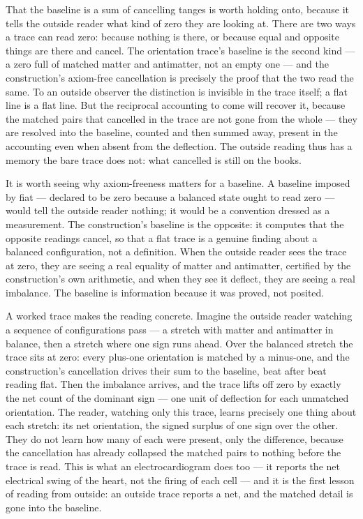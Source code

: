 That the baseline is a sum of cancelling tanges is worth holding onto, because it tells the outside reader
what kind of zero they are looking at. There are two ways a trace can read zero: because nothing is there,
or because equal and opposite things are there and cancel. The orientation trace's baseline is the second
kind --- a zero full of matched matter and antimatter, not an empty one --- and the construction's
axiom-free cancellation is precisely the proof that the two read the same. To an outside observer the
distinction is invisible in the trace itself; a flat line is a flat line. But the reciprocal accounting to
come will recover it, because the matched pairs that cancelled in the trace are not gone from the whole
--- they are resolved into the baseline, counted and then summed away, present in the accounting even when
absent from the deflection. The outside reading thus has a memory the bare trace does not: what cancelled
is still on the books.

It is worth seeing why axiom-freeness matters for a baseline. A baseline imposed by fiat --- declared to
be zero because a balanced state ought to read zero --- would tell the outside reader nothing; it would
be a convention dressed as a measurement. The construction's baseline is the opposite: it computes that
the opposite readings cancel, so that a flat trace is a genuine finding about a balanced configuration,
not a definition. When the outside reader sees the trace at zero, they are seeing a real equality of
matter and antimatter, certified by the construction's own arithmetic, and when they see it deflect, they
are seeing a real imbalance. The baseline is information because it was proved, not posited.

A worked trace makes the reading concrete. Imagine the outside reader watching a sequence of
configurations pass --- a stretch with matter and antimatter in balance, then a stretch where one sign
runs ahead. Over the balanced stretch the trace sits at zero: every plus-one orientation is matched by a
minus-one, and the construction's cancellation drives their sum to the baseline, beat after beat reading
flat. Then the imbalance arrives, and the trace lifts off zero by exactly the net count of the dominant
sign --- one unit of deflection for each unmatched orientation. The reader, watching only this trace,
learns precisely one thing about each stretch: its net orientation, the signed surplus of one sign over
the other. They do not learn how many of each were present, only the difference, because the cancellation
has already collapsed the matched pairs to nothing before the trace is read. This is what an
electrocardiogram does too --- it reports the net electrical swing of the heart, not the firing of each
cell --- and it is the first lesson of reading from outside: an outside trace reports a net, and the
matched detail is gone into the baseline.


